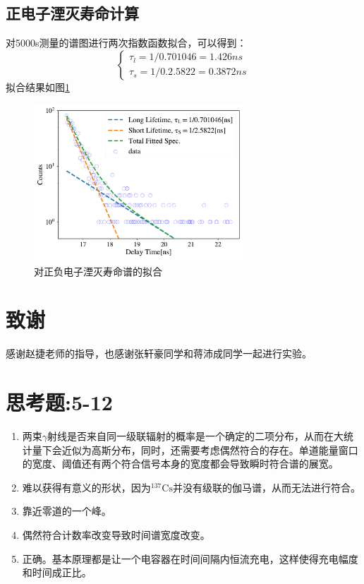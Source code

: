 \documentclass{article}
\begin{document}
\subsection{正电子湮灭寿命计算}
对5000s测量的谱图进行两次指数函数拟合，可以得到：
\begin{equation}
\begin{cases}
\tau_{l} = 1/0.701046 = 1.426\si{ns}\\    
\tau_{s} = 1/0.2.5822 = 0.3872\si{ns}
\end{cases}
\end{equation}
拟合结果如图\ref{fig:5ks}
\begin{figure}[htbp]
    \centering
    \includegraphics[width=0.7\textwidth]{../plots/5ks.pdf}
    \caption{对正负电子湮灭寿命谱的拟合\label{fig:5ks}}
\end{figure}
\section{致谢}
    感谢赵捷老师的指导，也感谢张轩豪同学和蒋沛成同学一起进行实验。 
    \clearpage
    \appendix
    \appendixpage
    \section{思考题:5-12}
    \begin{enumerate}
        \item 两束$\gamma$射线是否来自同一级联辐射的概率是一个确定的二项分布，从而在大统计量下会近似为高斯分布，同时，还需要考虑偶然符合的存在。单道能量窗口的宽度、阈值还有两个符合信号本身的宽度都会导致瞬时符合谱的展宽。
        \item 难以获得有意义的形状，因为$^{137}\text{Cs}$并没有级联的伽马谱，从而无法进行符合。
        \item 靠近零道的一个峰。
        \item 偶然符合计数率改变导致时间谱宽度改变。
        \item 正确。基本原理都是让一个电容器在时间间隔内恒流充电，这样使得充电幅度和时间成正比。
    \end{enumerate}
\end{document}
